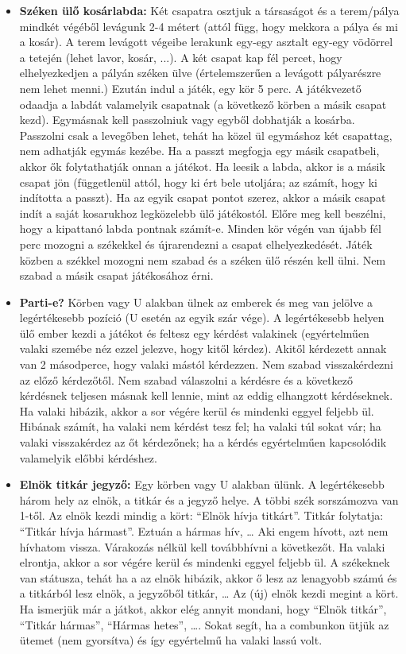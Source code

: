 \documentclass[a4paper, 12pt, twoside, openright]{article}
\begin{document}
\begin{itemize}
\item \textbf{Széken ülő kosárlabda:} Két csapatra osztjuk a társaságot és a terem/pálya mindkét végéből levágunk 2-4 métert (attól függ, hogy mekkora a pálya és mi a kosár). A terem levágott végeibe lerakunk egy-egy asztalt egy-egy vödörrel a tetején (lehet lavor, kosár, ...). A két csapat kap fél percet, hogy elhelyezkedjen a pályán széken ülve (értelemszerűen a levágott pályarészre nem lehet menni.) Ezután indul a játék, egy kör 5 perc. A játékvezető odaadja a labdát valamelyik csapatnak (a következő körben a másik csapat kezd). Egymásnak kell passzolniuk vagy egyből dobhatják a kosárba. Passzolni csak a levegőben lehet, tehát ha közel ül egymáshoz két csapattag, nem adhatják egymás kezébe. Ha a passzt megfogja egy másik csapatbeli, akkor ők folytathatják onnan a játékot. Ha leesik a labda, akkor is a másik csapat jön (függetlenül attól, hogy ki ért bele utoljára; az számít, hogy ki indította a passzt). Ha az egyik csapat pontot szerez, akkor a másik csapat indít a saját kosarukhoz legközelebb ülő játékostól. Előre meg kell beszélni, hogy a kipattanó labda pontnak számít-e. Minden kör végén van újabb fél perc mozogni a székekkel és újrarendezni a csapat elhelyezkedését. Játék közben a székkel mozogni nem szabad és a széken ülő részén kell ülni. Nem szabad a másik csapat játékosához érni.

\item \textbf{Parti-e?} Körben vagy U alakban ülnek az emberek és meg van jelölve a legértékesebb pozíció (U esetén az egyik szár vége). A legértékesebb helyen ülő ember kezdi a játékot és feltesz egy kérdést valakinek (egyértelműen valaki szemébe néz ezzel jelezve, hogy kitől kérdez). Akitől kérdezett annak van 2 másodperce, hogy valaki mástól kérdezzen. Nem szabad visszakérdezni az előző kérdezőtől. Nem szabad válaszolni a kérdésre és a következő kérdésnek teljesen másnak kell lennie, mint az eddig elhangzott kérdéseknek. Ha valaki hibázik, akkor a sor végére kerül és mindenki eggyel feljebb ül. Hibának számít, ha valaki nem kérdést tesz fel; ha valaki túl sokat vár; ha valaki visszakérdez az őt kérdezőnek; ha a kérdés egyértelműen kapcsolódik valamelyik előbbi kérdéshez.

\item \textbf{Elnök titkár jegyző:} 
Egy körben vagy U alakban ülünk. A legértékesebb három hely az elnök, a titkár és a jegyző helye. A többi szék sorszámozva van 1-től. Az elnök kezdi mindig a kört: ``Elnök hívja titkárt''. Titkár folytatja: ``Titkár hívja hármast''. Eztuán a hármas hív, \dots{} Aki engem hívott, azt nem hívhatom vissza. Várakozás nélkül kell továbbhívni a következőt. Ha valaki elrontja, akkor a sor végére kerül és mindenki eggyel feljebb ül. A székeknek van státusza, tehát ha a az elnök hibázik, akkor ő lesz az lenagyobb számú és a titkárból lesz elnök, a jegyzőből titkár, \dots{} Az (új) elnök kezdi megint a kört. Ha ismerjük már a játkot, akkor elég annyit mondani, hogy ``Elnök titkár'', ``Titkár hármas'', ``Hármas hetes'', \dots{}. Sokat segít, ha a combunkon ütjük az ütemet (nem gyorsítva) és így egyértelmű ha valaki lassú volt.
 

\end{itemize}
\end{document}
